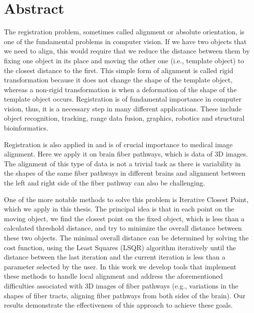 \documentclass[../structure.tex]{subfiles}
\begin{document}
\chapter{Abstract}
The registration problem, sometimes called alignment or absolute orientation, is one of the fundamental problems in computer vision. If we have two objects that we need to align, this would require that we reduce the distance between them by fixing one object in its place and moving the other one (i.e., template object) to the closest distance to the first. This simple form of alignment is called rigid transformation because it does not change the shape of the template object, whereas a non-rigid transformation is when a deformation of the shape of the template object occurs. Registration is of fundamental importance in computer vision, thus, it is a necessary step in many different applications. These include object recognition, tracking, range data fusion, graphics, robotics and structural bioinformatics.

Registration is also applied in and is of crucial importance to medical image alignment. Here we apply it on brain fiber pathways, which is data of 3D images. The alignment of this type of data is not a trivial task as there is variability  in the shapes of the same fiber pathways in different brains and alignment between the left and right side of the fiber pathway can also be challenging.

One of the more notable methods to solve this problem is Iterative Closest Point, which we apply in this thesis. The principal idea is that in each point on the moving object, we find the closest point on the fixed object, which is less than a calculated threshold distance, and try to minimize the overall distance between these two objects. The minimal overall distance can be determined by solving the cost function, using the Least Squares (LSQR) algorithm iteratively until the distance between the last iteration and the current iteration is less than a parameter selected by the user. In this work we develop tools that implement these methods to handle local alignment and address the aforementioned difficulties associated with 3D images of fiber pathways (e.g., variations in the shapes of fiber tracts, aligning fiber pathways from both sides of the brain). Our results demonstrate the effectiveness of this approach to achieve these goals.
\end{document}
